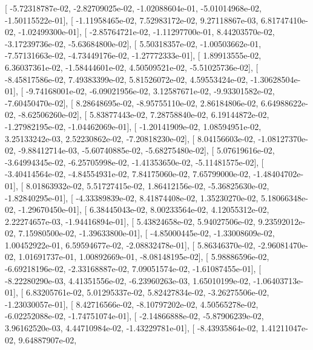 \documentclass{article}
\begin{document}
       [ -5.72318787e-02,  -2.82709025e-02,  -1.02088604e-01,
         -5.01014968e-02,  -1.50115522e-01],
       [ -1.11958465e-02,   7.52983172e-02,   9.27118867e-03,
          6.81747410e-02,  -1.02499300e-01],
       [ -2.85764721e-02,  -1.11297700e-01,   8.44203570e-02,
         -3.17239736e-02,  -5.63684800e-02],
       [  5.50318357e-02,  -1.00503662e-01,  -7.57131663e-02,
         -4.73449176e-02,  -1.27772333e-01],
       [  1.89913555e-02,   6.36037361e-02,  -1.58444601e-02,
          4.50509521e-02,  -5.51025736e-02],
       [ -8.45817586e-02,   7.49383399e-02,   5.81526072e-02,
          4.59553424e-02,  -1.30628504e-01],
       [ -9.74168001e-02,  -6.09021956e-02,   3.12587671e-02,
         -9.93301582e-02,  -7.60450470e-02],
       [  8.28648695e-02,  -8.95755110e-02,   2.86184806e-02,
          6.64988622e-02,  -8.62506260e-02],
       [  5.83877443e-02,   7.28758840e-02,   6.19144872e-02,
         -1.27982195e-02,  -1.04462069e-01],
       [ -1.20141909e-02,   1.08594951e-02,   3.25133242e-03,
          2.52230862e-02,  -7.20818230e-02],
       [  8.04156603e-02,  -1.08127370e-02,  -9.88412714e-03,
         -5.60740885e-02,  -5.68275480e-02],
       [  5.07619616e-02,  -3.64994345e-02,  -6.25705998e-02,
         -1.41353650e-02,  -5.11481575e-02],
       [ -3.40414564e-02,  -4.84554931e-02,   7.84175060e-02,
          7.65799000e-02,  -1.48404702e-01],
       [  8.01863932e-02,   5.51727415e-02,   1.86412156e-02,
         -5.36825630e-02,  -1.82840295e-01],
       [ -4.33389839e-02,   8.41874408e-02,   1.35230270e-02,
          5.18066348e-02,  -1.29670450e-01],
       [  6.38445043e-02,   8.00233564e-02,   4.12055312e-02,
          2.22274657e-03,  -1.94416894e-01],
       [  5.43824658e-02,   5.94027506e-02,   9.23592012e-02,
          7.15980500e-02,  -1.39633800e-01],
       [ -4.85000445e-02,  -1.33008609e-02,   1.00452922e-01,
          6.59594677e-02,  -2.08832478e-01],
       [  5.86346370e-02,  -2.96081470e-02,   1.01691737e-01,
          1.00892669e-01,  -8.08148195e-02],
       [  5.98886596e-02,  -6.69218196e-02,  -2.33168887e-02,
          7.09051574e-02,  -1.61087455e-01],
       [ -8.22280290e-03,   4.41351556e-02,  -6.23960263e-03,
          1.65010199e-02,  -1.06403713e-01],
       [  6.83205761e-02,   5.01295337e-02,   5.82427834e-02,
         -3.26275506e-02,  -1.23030057e-01],
       [  8.42716566e-02,  -8.10797202e-02,   4.50565278e-02,
         -6.02252088e-02,  -1.74751074e-01],
       [ -2.14866888e-02,  -5.87906239e-02,   3.96162520e-03,
          4.44710984e-02,  -1.43229781e-01],
       [ -8.43935864e-02,   1.41211047e-02,   9.64887907e-02,
\end{document}
